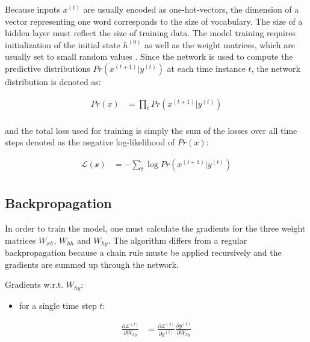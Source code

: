 \documentclass[]{krantz}
\providecommand{\tightlist}{%
  \setlength{\itemsep}{0pt}\setlength{\parskip}{0pt}}
\begin{document}
\citep{graves2013generating}

Because inputs \(x^{(t)}\) are usually encoded as one-hot-vectors, the dimension of a vector representing one word corresponds to the size of vocabulary. The size of a hidden layer must reflect the size of training data. The model training requires initialization of the initial state \(h^{(0)}\) as well as the weight matrices, which are usually set to small random values \citep{mikolov2010recurrent}. Since the network is used to compute the predictive distributions \(Pr(x^{(t+1)}|y^{(t)})\) at each time instance \(t\), the network distribution is denoted as:

\begin{align}
Pr(x) & =\prod_{t} Pr(x^{(t+1)}|y^{(t)}) \label{eq:rnn-probability} \\
\end{align}

and the total loss used for training is simply the sum of the losses over all time steps denoted as the negative log-likelihood of \(Pr(x)\):

\begin{align}
\mathcal{L(x)} & =-\sum_{t} \log{Pr(x^{(t+1)}|y^{(t)})} \label{eq:rnn-log-loss} \\
\end{align}

\citep{graves2013generating}

\hypertarget{backpropagation}{%
\subsection{Backpropagation}\label{backpropagation}}

In order to train the model, one must calculate the gradients for the three weight matrices \(W_{xh}\), \(W_{hh}\) and \(W_{hy}\). The algorithm differs from a regular backpropagation because a chain rule muste be applied recursively and the gradients are summed up through the network. \citep{boden2002guide}

Gradients w.r.t. \(W_{hy}\):

\begin{itemize}
\tightlist
\item
  for a single time step \(t\):
\end{itemize}

\begin{align}
\frac{\partial \mathcal{L^{(t)}}}{\partial W_{hy}} & = \frac{\partial \mathcal{L^{(t)}}}{\partial y^{(t)}} \frac{\partial y^{(t)}}{\partial W_{hy}}\label{eq:rnn-back-hy-one} \\
\end{align}
\end{document}
